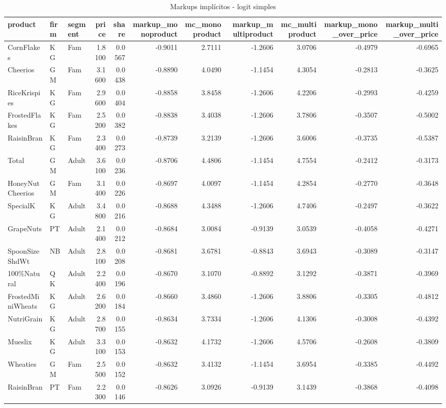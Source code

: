 \begin{table}[!htbp]
\centering
\caption{Markups implícitos - logit simples}
\label{tab:markups}
\small
\begin{tabular}{lllrrrrrrrr}
\toprule
product & firm & segment & price & share & markup_monoproduct & mc_monoproduct & markup_multiproduct & mc_multiproduct & markup_mono_over_price & markup_multi_over_price \\
\midrule
CornFlakes & KG & Fam & 1.8100 & 0.0567 & -0.9011 & 2.7111 & -1.2606 & 3.0706 & -0.4979 & -0.6965 \\
Cheerios & GM & Fam & 3.1600 & 0.0438 & -0.8890 & 4.0490 & -1.1454 & 4.3054 & -0.2813 & -0.3625 \\
RiceKrispies & KG & Fam & 2.9600 & 0.0404 & -0.8858 & 3.8458 & -1.2606 & 4.2206 & -0.2993 & -0.4259 \\
FrostedFlakes & KG & Fam & 2.5200 & 0.0382 & -0.8838 & 3.4038 & -1.2606 & 3.7806 & -0.3507 & -0.5002 \\
RaisinBran & KG & Fam & 2.3400 & 0.0273 & -0.8739 & 3.2139 & -1.2606 & 3.6006 & -0.3735 & -0.5387 \\
Total & GM & Adult & 3.6100 & 0.0236 & -0.8706 & 4.4806 & -1.1454 & 4.7554 & -0.2412 & -0.3173 \\
HoneyNutCheerios & GM & Fam & 3.1400 & 0.0226 & -0.8697 & 4.0097 & -1.1454 & 4.2854 & -0.2770 & -0.3648 \\
SpecialK & KG & Adult & 3.4800 & 0.0216 & -0.8688 & 4.3488 & -1.2606 & 4.7406 & -0.2497 & -0.3622 \\
GrapeNuts & PT & Adult & 2.1400 & 0.0212 & -0.8684 & 3.0084 & -0.9139 & 3.0539 & -0.4058 & -0.4271 \\
SpoonSizeShdWt & NB & Adult & 2.8100 & 0.0208 & -0.8681 & 3.6781 & -0.8843 & 3.6943 & -0.3089 & -0.3147 \\
100\%Natural & QK & Adult & 2.2400 & 0.0196 & -0.8670 & 3.1070 & -0.8892 & 3.1292 & -0.3871 & -0.3969 \\
FrostedMiniWheats & KG & Adult & 2.6200 & 0.0184 & -0.8660 & 3.4860 & -1.2606 & 3.8806 & -0.3305 & -0.4812 \\
NutriGrain & KG & Adult & 2.8700 & 0.0155 & -0.8634 & 3.7334 & -1.2606 & 4.1306 & -0.3008 & -0.4392 \\
Mueslix & KG & Adult & 3.3100 & 0.0153 & -0.8632 & 4.1732 & -1.2606 & 4.5706 & -0.2608 & -0.3809 \\
Wheaties & GM & Fam & 2.5500 & 0.0152 & -0.8632 & 3.4132 & -1.1454 & 3.6954 & -0.3385 & -0.4492 \\
RaisinBran & PT & Fam & 2.2300 & 0.0146 & -0.8626 & 3.0926 & -0.9139 & 3.1439 & -0.3868 & -0.4098 \\

\end{tabular}
\end{table}

